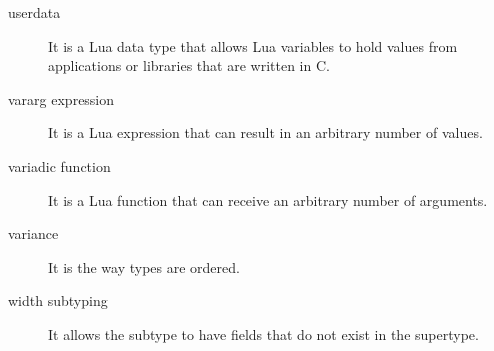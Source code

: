 \begin{description}
\item[userdata] It is a Lua data type that allows Lua variables to hold values from applications
or libraries that are written in C.

\item[vararg expression] It is a Lua expression that can result in an arbitrary number of values.

\item[variadic function] It is a Lua function that can receive an arbitrary number of arguments.

\item[variance] It is the way types are ordered.

\item[width subtyping] It allows the subtype to have fields that do not exist in the supertype.

\end{description}
